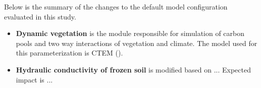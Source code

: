 \documentclass[a0b,landscape]{a0poster}
\begin{document}
\begin{multicols*}{4}
\vspace{0.5cm}
\noindent
{}

\vspace{0.5cm}

Below is the summary of the changes to the default model configuration evaluated in this study.
\begin{itemize}
  \item \textbf{Dynamic vegetation} is the module responsible for simulation of carbon pools and
  two way interactions of vegetation and climate. The model used for this parameterization is CTEM ().

  \item \textbf{Hydraulic conductivity of frozen soil} is modified based on ... Expected impact is ...
\end{itemize}


\end{multicols*}
\end{document}
